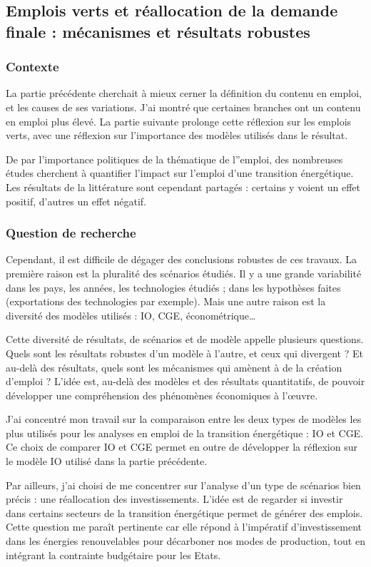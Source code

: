 \subsection{Emplois verts et réallocation de la demande finale : mécanismes et résultats robustes}
\subsubsection{Contexte}
La partie précédente cherchait à mieux cerner la définition du contenu en emploi, et les causes de ses variations. J’ai montré que certaines branches ont un contenu en emploi plus élevé. 
La partie suivante prolonge cette réflexion sur les emplois verts, avec une réflexion sur l’importance des modèles utilisés dans le résultat. 

De par l'importance politiques de la thématique de l''emploi, des nombreuses études cherchent à quantifier l'impact sur l'emploi d'une transition énergétique. Les résultats de la littérature sont cependant partagés : certains y voient un effet positif, d’autres un effet négatif.

\subsubsection{Question de recherche}
Cependant, il est difficile de dégager des conclusions robustes de ces travaux. La première raison est la pluralité des scénarios étudiés. Il y a une grande variabilité dans les pays, les années, les technologies étudiés ; dans les hypothèses faites (exportations des technologies par exemple).
Mais une autre raison est la diversité des modèles utilisés : IO, CGE, économétrique…

Cette diversité de résultats, de scénarios et de modèle appelle plusieurs questions. Quels sont les résultats robustes d’un modèle à l’autre, et ceux qui divergent ? Et au-delà des résultats, quels sont les mécanismes qui amènent à de la création d’emploi ? L’idée est, au-delà des modèles et des résultats quantitatifs, de pouvoir développer une compréhension des phénomènes économiques à l’œuvre. 

J’ai concentré mon travail sur la comparaison entre les deux types de modèles les plus utilisés pour les analyses en emploi de la transition énergétique : IO et CGE. Ce choix de comparer IO et CGE permet en outre de développer la réflexion sur le modèle IO utilisé dans la partie précédente.

Par ailleurs, j’ai choisi de me concentrer sur l’analyse d’un type de scénarios bien précis : une réallocation des investissements. L’idée est de regarder si investir dans certains secteurs de la transition énergétique permet de générer des emplois. Cette question me paraît pertinente car elle répond à l’impératif d’investissement dans les énergies renouvelables pour décarboner nos modes de production, tout en intégrant la contrainte budgétaire pour les Etats.

